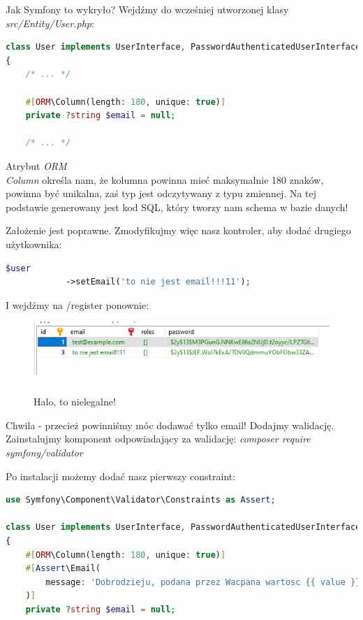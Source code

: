 \documentclass[polish, a4paper]{article}
\begin{document}
Jak Symfony to wykryło? Wejdźmy do wcześniej utworzonej klasy \emph{src/Entity/User.php}:

\begin{lstlisting}[language=PHP, caption=src/Entity/User.php]
class User implements UserInterface, PasswordAuthenticatedUserInterface
{
    /* ... */
    
    #[ORM\Column(length: 180, unique: true)]
    private ?string $email = null;

    /* ... */
\end{lstlisting}

Atrybut \emph{ORM\\Column} określa nam, że kolumna powinna mieć maksymalnie 180 znaków, powinna być unikalna, zaś typ jest odczytywany z typu zmiennej. Na tej podstawie generowany jest kod SQL, który tworzy nam schema w bazie danych! 

Założenie jest poprawne. Zmodyfikujmy więc nasz kontroler, aby dodać drugiego użytkownika:

\begin{lstlisting}[language=PHP, caption=Controller/IndexController.php]
        $user
            ->setEmail('to nie jest email!!!11');
\end{lstlisting}

I wejdźmy na /register ponownie:

\begin{figure}[H]
  \centering
  \includegraphics[width=\textwidth]{email2.png}
  \caption{Halo, to nielegalne!}
\end{figure}

Chwila - przecież powinniśmy móc dodawać tylko email! Dodajmy walidację. Zainstalujmy komponent odpowiadający za walidację: \emph{composer require symfony/validator}

Po instalacji możemy dodać nasz pierwszy constraint:

\begin{lstlisting}[language=PHP, caption=Entity/User.php]
use Symfony\Component\Validator\Constraints as Assert;

class User implements UserInterface, PasswordAuthenticatedUserInterface
{
    #[ORM\Column(length: 180, unique: true)]
    #[Assert\Email(
        message: 'Dobrodzieju, podana przez Wacpana wartosc {{ value }} nie jest poprawnym adresem poczty elektronicznej!',
    )]
    private ?string $email = null;
\end{lstlisting}
\end{document}
